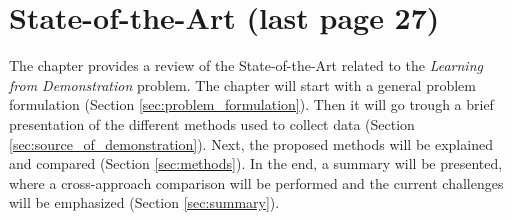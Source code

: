 \section{State-of-the-Art (last page 27)}
\label{sec:sota}
The chapter provides a review of the State-of-the-Art related to the \textit{Learning from Demonstration} problem. The chapter will start with a general problem formulation (Section \ref{sec:problem_formulation}). Then it will go trough a brief presentation of the different methods used to collect data (Section \ref{sec:source_of_demonstration}). Next, the proposed methods will be explained and compared (Section \ref{sec:methods}). In the end, a summary will be presented, where a cross-approach comparison will be performed and the current challenges will be emphasized (Section \ref{sec:summary}). 



